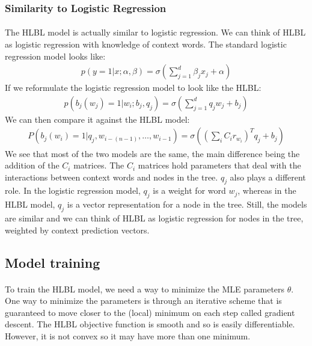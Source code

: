 \subsubsection{Similarity to Logistic Regression}
\paragraph{}
The HLBL model is actually similar to logistic regression. We can think of HLBL as logistic regression with knowledge of context words. 
The standard logistic regression model looks like:
\begin{align}
p(y =1 | x; \alpha, \beta) = \sigma \left( \sum_{j=1}^d \beta_j x_j + \alpha \right)
\end{align}
If we reformulate the logistic regression model to look like the HLBL:
\begin{align}
p( b_j(w_j) = 1 | w_i; b_j, q_j) = \sigma \left( \sum_{j=1}^d q_j w_j + b_j \right)
\end{align}
We can then compare it against the HLBL model:
\begin{align}
P(b_j(w_i) = 1 | q_j, w_{i-(n-1)},\dots, w_{i-1}) =  \sigma( (\sum_i C_i r_{w_i})^T q_{j} +b_{j})
\end{align}
We see that most of the two models are the same, the main difference being the addition of the $C_i$ matrices.  The $C_i$ matrices hold parameters that deal with the interactions between context words and nodes in the tree. $q_j$ also plays a different role. In the logistic regression model, $q_j$ is a weight for word $w_j$, whereas in the HLBL model, $q_j$ is a vector representation for a node in the tree. Still, the models are similar and we can think of HLBL as logistic regression for nodes in the tree, weighted by context prediction vectors.


\subsection{Model training}
\paragraph{}
To train the HLBL model, we need a way to minimize the MLE parameters $\hat{\theta}$. One way to minimize the parameters is through an iterative scheme that is guaranteed to move closer to the (local) minimum on each step called gradient descent. The HLBL objective function is smooth and so is easily differentiable. However, it is not convex so it may have more than one minimum. 
